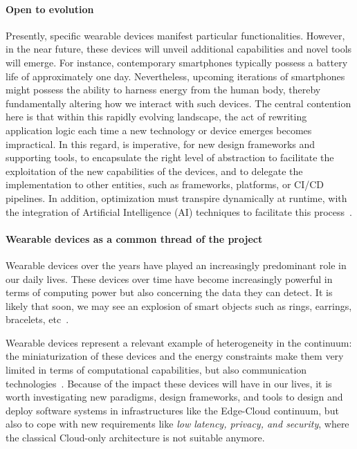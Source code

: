 \documentclass[12pt,a4paper]{article}
\begin{document}
\paragraph{Open to evolution}
Presently,
specific wearable devices manifest particular functionalities.
%
However,
in the near future,
these devices will unveil additional capabilities and novel tools will emerge.
%
For instance,
contemporary smartphones typically possess a battery life of approximately one day.
%
Nevertheless,
upcoming iterations of smartphones might possess the ability to harness energy from the human body,
thereby fundamentally altering how we interact with such devices.
%
The central contention here is that within this rapidly evolving landscape,
the act of rewriting application logic each time a new technology or device emerges becomes impractical.
%
In this regard,
is imperative,
for new design frameworks and supporting tools,
to encapsulate the right level of abstraction to facilitate the exploitation of the new capabilities of the devices,
and to delegate the implementation to other entities,
such as frameworks, platforms, or CI/CD pipelines.
%
In addition,
optimization must transpire dynamically at runtime,
with the integration of Artificial Intelligence (AI) techniques to facilitate this process~\cite{DBLP:journals/computing/ShahidaniGHK23}.

\paragraph{Wearable devices as a common thread of the project}
Wearable devices over the years have played an increasingly predominant role in our daily lives.
These devices over time have become increasingly powerful in terms of computing power but also concerning the data they can detect.
%
It is likely that soon,
we may see an explosion of smart objects such as rings,
earrings, bracelets, etc~\cite{DBLP:conf/islped/BasaklarTAO21}.

Wearable devices represent a relevant example of heterogeneity in the continuum:
the miniaturization of these devices and the energy constraints make them very limited in terms of computational capabilities,
but also communication technologies~\cite{DBLP:journals/fteda/YinAMJ18, DBLP:journals/dt/BhatDO19}.
%
Because of the impact these devices will have in our lives,
it is worth investigating new paradigms, design frameworks, and tools to design and deploy software systems in infrastructures like the Edge-Cloud continuum,
but also to cope with new requirements like \emph{low latency, privacy, and security},
where the classical Cloud-only architecture is not suitable anymore.
\end{document}
